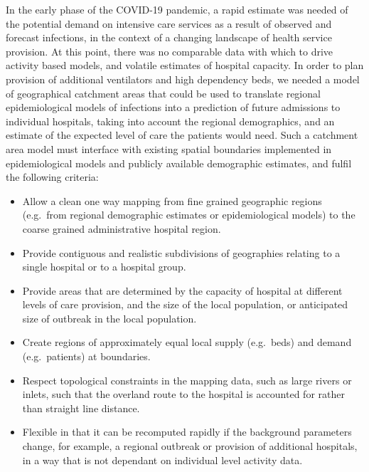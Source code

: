 \documentclass[twocolumn]{bmcart}%
\providecommand{\tightlist}{%
  \setlength{\itemsep}{0pt}\setlength{\parskip}{0pt}}
\begin{document}
In the early phase of the COVID-19 pandemic, a rapid estimate was needed of the potential demand on intensive care 
services as a result of observed and forecast infections, in the context of a changing landscape of health service 
provision. At this point, there was no comparable data with which to drive activity based models, and volatile 
estimates of hospital capacity. In order to plan provision of additional ventilators and high dependency beds, we needed 
a model of geographical catchment areas that could be used to translate regional epidemiological models of infections 
into a prediction of future admissions to individual hospitals, taking into account the regional demographics, and an 
estimate of the expected level of care the patients would need. Such a catchment area model must interface with existing 
spatial boundaries implemented in epidemiological models and publicly available demographic estimates, and fulfil the 
following criteria:

\begin{itemize}
\tightlist
\item
  Allow a clean one way mapping from fine grained geographic regions (e.g.~from regional demographic estimates or 
epidemiological models) to the coarse grained administrative hospital region.
\item
  Provide contiguous and realistic subdivisions of geographies relating to a single hospital or to a hospital group.
\item
  Provide areas that are determined by the capacity of hospital at different levels of care provision, and the size of 
the local population, or anticipated size of outbreak in the local population.
\item
  Create regions of approximately equal local supply (e.g.~beds) and demand (e.g.~patients) at boundaries.
\item
  Respect topological constraints in the mapping data, such as large rivers or inlets, such that the overland route to 
the hospital is accounted for rather than straight line distance.
\item
  Flexible in that it can be recomputed rapidly if the background parameters change, for example, a regional outbreak or 
provision of additional hospitals, in a way that is not dependant on individual level activity data.
\end{itemize}
\end{document}
